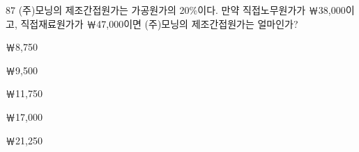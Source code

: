 \begin{question}{87}
(주)모닝의 제조간접원가는 가공원가의 20\%이다. 만약 직접노무원가가 ￦38,000이고, 직접재료원가가 ￦47,000이면 (주)모닝의 제조간접원가는 얼마인가?
\begin{choices}
  \item ￦8,750
  \item ￦9,500
  \item ￦11,750
  \item ￦17,000
  \item ￦21,250
\end{choices}
\end{question}
